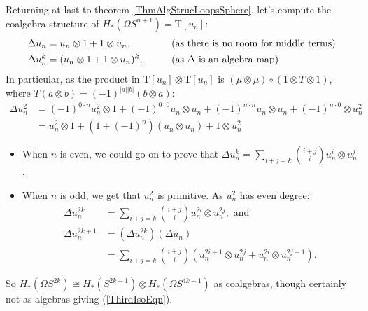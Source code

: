 \documentclass{article}
\newcommand{\Loops}{\Omega}
\theoremstyle{definition}
\begin{document}
Returning at last to theorem \ref{ThmAlgStrucLoopsSphere}, let's compute the coalgebra structure of $H_* (\Loops S^{n+1}) =\mathrm T[u_n]$:
\begin{alignat*}{2}
\Delta u_n & = u_n \otimes 1 + 1 \otimes u_n,&\qquad&\textup{(as there is no room for middle terms)} \\
\Delta u_n^k & = (u_n \otimes 1 + 1 \otimes u_n)^k,&&\textup{(as $\Delta$ is an algebra map)}
\end{alignat*}
In particular, as the product in $\mathrm T[u_n]\otimes \mathrm T[u_n]$ is $(\mu\otimes\mu)\circ (1\otimes T\otimes1)$, where $T(a\otimes b)=(-1)^{|a||b|}(b\otimes a)$:
\begin{align*}
\Delta u_n^2&=(-1)^{0\cdot n}u_n^2\otimes1+(-1)^{0\cdot0}u_n\otimes u_n+(-1)^{n\cdot n}u_n\otimes u_n+(-1)^{n\cdot 0}\otimes u_n^2\\
&=u_n^2\otimes1+(1+(-1)^{n})(u_n\otimes u_n)+1\otimes u_n^2
\end{align*}
\begin{itemize}
\item When $n$ is even, we could go on to prove that $\Delta u_n^k = {\displaystyle\sum_{i + j = k}} \binom{i+j}{i} u_n^i \otimes u_n^j$.
\item When $n$ is odd, we get that $u_n^2$ is primitive. As $u_n^2$ has even degree:
\begin{align*}
\Delta u_n^{2k} & = \sum_{i+j=k} {\textstyle\binom{i+j}{i}} u_n^{2i} \otimes u_n^{2j}, \text{ \ and}\\
\Delta u_n^{2k+1} & = (\Delta u_n^{2k})(\Delta u_n) \\
& = \sum_{i+j=k} {\textstyle\binom{i+j}{i}} (u_n^{2i+1} \otimes u_n^{2j} + u_n^{2i} \otimes u_n^{2j+1}).
\end{align*}
\end{itemize}
So $H_* (\Loops S^{2k} )\cong H_*( S^{2k-1}) \otimes H_* (\Loops S^{4k-1})$ as coalgebras, though certainly not as algebras giving (\ref{ThirdIsoEqn}).
\end{document}
